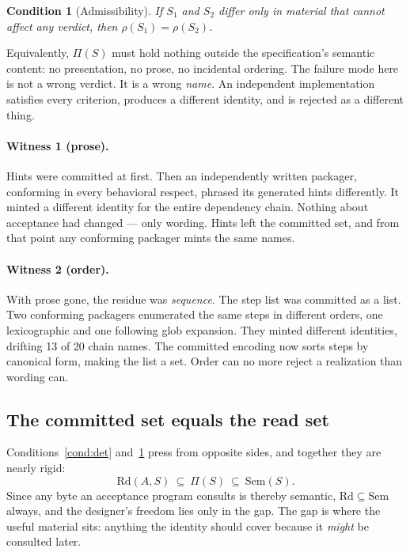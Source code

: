 \documentclass[10pt,twocolumn,letterpaper]{article}
\newtheorem{condition}{Condition}
\begin{document}
\begin{condition}[Admissibility]
\label{cond:adm}
If $S_1$ and $S_2$ differ only in material that cannot affect any verdict, then $\rho(S_1)=\rho(S_2)$.
\end{condition}

\noindent Equivalently, $\Pi(S)$ must hold nothing outside the specification's semantic content: no presentation, no prose, no incidental ordering. The failure mode here is not a wrong verdict. It is a wrong \emph{name}. An independent implementation satisfies every criterion, produces a different identity, and is rejected as a different thing.

\paragraph{Witness 1 (prose).} Hints were committed at first. Then an independently written packager, conforming in every behavioral respect, phrased its generated hints differently. It minted a different identity for the entire dependency chain. Nothing about acceptance had changed --- only wording. Hints left the committed set, and from that point any conforming packager mints the same names.

\paragraph{Witness 2 (order).} With prose gone, the residue was \emph{sequence}. The step list was committed as a list. Two conforming packagers enumerated the same steps in different orders, one lexicographic and one following glob expansion. They minted different identities, drifting 13 of 20 chain names. The committed encoding now sorts steps by canonical form, making the list a set. Order can no more reject a realization than wording can.

\subsection{The committed set equals the read set}
Conditions~\ref{cond:det} and~\ref{cond:adm} press from opposite sides, and together they are nearly rigid:
\begin{equation}
\mathrm{Rd}(A,S)\ \subseteq\ \Pi(S)\ \subseteq\ \mathrm{Sem}(S).
\label{eq:sandwich}
\end{equation}
Since any byte an acceptance program consults is thereby semantic, $\mathrm{Rd}\subseteq\mathrm{Sem}$ always, and the designer's freedom lies only in the gap. The gap is where the useful material sits: anything the identity should cover because it \emph{might} be consulted later.
\end{document}
